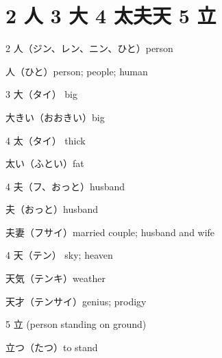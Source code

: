\section{2 人 3 大 4 太夫天 5 立}

2 人（ジン、レン、ニン、ひと）person

人（ひと）person; people; human

3 大（タイ） big

大きい（おおきい）big

4 太（タイ） thick

太い（ふとい）fat

4 夫（フ、おっと）husband

夫（おっと）husband

夫妻（フサイ）married couple; husband and wife

4 天（テン） sky; heaven

天気（テンキ）weather

天才（テンサイ）genius; prodigy

5 立 (person standing on ground)

立つ（たつ）to stand
